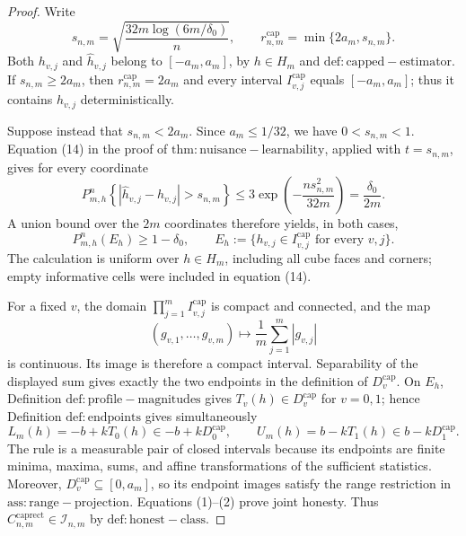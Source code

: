 \documentclass{article}
\begin{document}
\begin{proof}
Write
\[
 s_{n,m}=\sqrt{\frac{32m\log(6m/\delta_0)}{n}},
 \qquad r^{\mathrm{cap}}_{n,m}=\min\{2a_m,s_{n,m}\}.
\]
Both \(h_{v,j}\) and \(\widehat h_{v,j}\) belong to \([-a_m,a_m]\), by \(h\in H_m\) and \(\mathrm{def:capped-estimator}\). If \(s_{n,m}\geq2a_m\), then \(r^{\mathrm{cap}}_{n,m}=2a_m\) and every interval \(I^{\mathrm{cap}}_{v,j}\) equals \([-a_m,a_m]\); thus it contains \(h_{v,j}\) deterministically.

Suppose instead that \(s_{n,m}<2a_m\). Since \(a_m\leq1/32\), we have \(0<s_{n,m}<1\). Equation (14) in the proof of \(\mathrm{thm:nuisance-learnability}\), applied with \(t=s_{n,m}\), gives for every coordinate
\[
 P_{m,h}^{n}\!\left\{|\widehat h_{v,j}-h_{v,j}|>s_{n,m}\right\}
 \leq3\exp\!\left(-\frac{ns_{n,m}^2}{32m}\right)
 =\frac{\delta_0}{2m}.
\]
A union bound over the \(2m\) coordinates therefore yields, in both cases,
\[
 P_{m,h}^{n}(E_h)\geq1-\delta_0,
 \qquad
 E_h:=\{h_{v,j}\in I^{\mathrm{cap}}_{v,j}\text{ for every }v,j\}.       \tag{1}
\]
The calculation is uniform over \(h\in H_m\), including all cube faces and corners; empty informative cells were included in equation (14).

For a fixed \(v\), the domain \(\prod_{j=1}^{m}I^{\mathrm{cap}}_{v,j}\) is compact and connected, and the map
\[
 (g_{v,1},\ldots,g_{v,m})\longmapsto \frac1m\sum_{j=1}^{m}|g_{v,j}|
\]
is continuous. Its image is therefore a compact interval. Separability of the displayed sum gives exactly the two endpoints in the definition of \(D^{\mathrm{cap}}_v\). On \(E_h\), Definition \(\mathrm{def:profile-magnitudes}\) gives \(T_v(h)\in D^{\mathrm{cap}}_v\) for \(v=0,1\); hence Definition \(\mathrm{def:endpoints}\) gives simultaneously
\[
 L_m(h)=-b+kT_0(h)\in-b+kD^{\mathrm{cap}}_0,
 \qquad
 U_m(h)=b-kT_1(h)\in b-kD^{\mathrm{cap}}_1.                              \tag{2}
\]
The rule is a measurable pair of closed intervals because its endpoints are finite minima, maxima, sums, and affine transformations of the sufficient statistics. Moreover, \(D^{\mathrm{cap}}_v\subseteq[0,a_m]\), so its endpoint images satisfy the range restriction in \(\mathrm{ass:range-projection}\). Equations (1)--(2) prove joint honesty. Thus \(C^{\mathrm{caprect}}_{n,m}\in\mathcal I_{n,m}\) by \(\mathrm{def:honest-class}\).


\end{proof}
\end{document}
